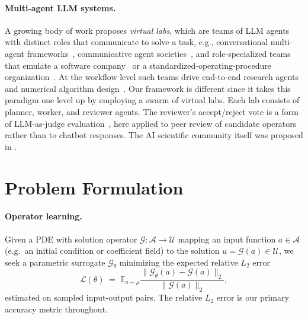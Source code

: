 \documentclass{article}
\begin{document}
\paragraph{Multi-agent LLM systems.} A growing body of work proposes {\em virtual labs}, which are teams of LLM agents with distinct roles that communicate to solve a task, e.g., conversational
multi-agent frameworks~\cite{wu2024autogen}, communicative agent societies~\cite{li2023camel}, and role-specialized teams that emulate a software company~\cite{qian2024chatdev} or a standardized-operating-procedure organization~\cite{hong2024metagpt}. At the workflow level such teams drive end-to-end research agents~\cite{lu2026aiscientist} and numerical algorithm design~\cite{toscano2025athena}. Our framework is different since it takes this paradigm one level up by employing a swarm of virtual labs. Each lab consists of planner, worker, and reviewer agents. The reviewer's accept/reject vote is a form of LLM-as-judge evaluation~\cite{zheng2023llmjudge}, here applied to peer review of candidate operators rather than to chatbot responses. The AI scientific community itself was proposed in \cite{braganeto2026aicommunity}.

\section{Problem Formulation}\label{sec:problem}
\paragraph{Operator learning.} Given a PDE with solution operator
$\mathcal{G}:\mathcal{A}\to\mathcal{U}$ mapping an input function $a\in\mathcal{A}$ (e.g.\ an initial condition or coefficient field) to the solution $u=\mathcal{G}(a)\in\mathcal{U}$, we seek a parametric surrogate $\mathcal{G}_\theta$ minimizing the expected relative $L_2$ error
\begin{equation}
\mathcal{L}(\theta) \;=\; \mathbb{E}_{a\sim\mu}
\frac{\lVert \mathcal{G}_\theta(a) - \mathcal{G}(a)\rVert_2}
     {\lVert \mathcal{G}(a)\rVert_2},
\end{equation}
estimated on sampled input-output pairs. The relative $L_2$ error is our primary accuracy metric throughout.
\end{document}
